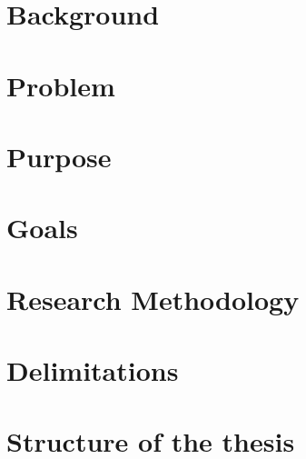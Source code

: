 

\section{Background}
    \label{sec:background}
    

\section{Problem}
    \label{sec:problem}
    

\section{Purpose}
    \label{sec:purpose}
    

\section{Goals}
    \label{sec:goals}
    

\section{Research Methodology}
    \label{sec:research_methodology}
    

\section{Delimitations}
    \label{sec:delimitations}
    

\section{Structure of the thesis}
    \label{sec:structure_thesis}
    